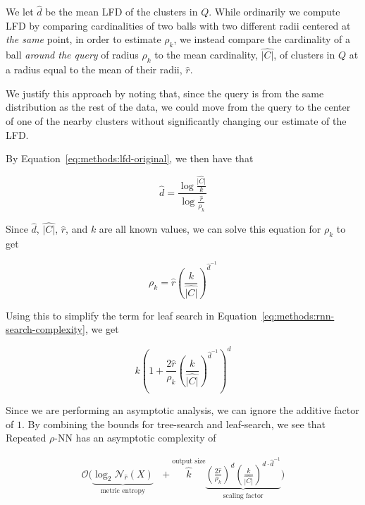 We let $\hat{d}$ be the mean LFD of the clusters in $Q$.
While ordinarily we compute LFD by comparing cardinalities of two balls with two different radii centered at \emph{the same} point, in order to estimate $\rho_k$, we instead compare the cardinality of a ball \emph{around the query} of radius $\rho_k$ to the mean cardinality, $\hat{|C|}$, of clusters in $Q$ at a radius equal to the mean of their radii, $\hat{r}$.

We justify this approach by noting that, since the query is from the same distribution as the rest of the data, we could move from the query to the center of one of the nearby clusters without significantly changing our estimate of the LFD.

By Equation~\ref{eq:methods:lfd-original}, we then have that

\begin{equation*}
    \hat{d} = \frac{\log{}\frac{\hat{|C|}}{k}}{\log{}\frac{\hat{r}}{\rho_k}}
\end{equation*}

Since $\hat{d}$, $\hat{|C|}$, $\hat{r}$, and $k$ are all known values, we can solve this equation for $\rho_k$ to get

\begin{equation*}
    \rho_k = \hat{r} \left( \frac{k}{\hat{|C|}} \right)^{\hat{d}^{-1}}
\end{equation*}

Using this to simplify the term for leaf search in Equation~\ref{eq:methods:rnn-search-complexity}, we get

\begin{equation*}
    k \left( 1+ \frac{2\hat{r}}{\rho_k} \left( \frac{k}{\hat{|C|}} \right) ^ {\hat{d}^{-1}} \right)^d
\end{equation*}

Since we are performing an asymptotic analysis, we can ignore the additive factor of $1$.
By combining the bounds for tree-search and leaf-search, we see that Repeated $\rho$-NN has an asymptotic complexity of

\begin{gather}
    \mathcal{O}
    \Bigg(
        \underbrace{\log_2{\mathcal{N}_{\hat{r}}(X)}}_{\textrm{metric entropy}} \ \ \ + 
        \overbrace{k}^{\textrm{output size}}
        \underbrace{
            \left( \frac{2\hat{r}}{\rho_k} \right) ^ d \left( \frac{k}{\hat{|C|}} \right) ^ {d \cdot \hat{d}^{-1}}
        }_{\textrm{scaling factor}}
    \Bigg)
    \label{eq:methods:repeated-rnn-complexity}
\end{gather}


